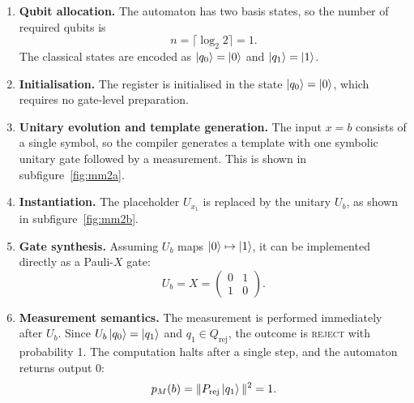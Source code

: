 \begin{enumerate}
  \item \textbf{Qubit allocation.} The automaton has two basis states, so the number of required qubits is
  \[
  n = \lceil \log_2 2 \rceil = 1.
  \]
  The classical states are encoded as $\ket{q_0} = \ket{0}$ and $\ket{q_1} = \ket{1}$.

  \item \textbf{Initialisation.} The register is initialised in the state $\ket{q_0} = \ket{0}$, which requires no gate-level preparation.

  \item \textbf{Unitary evolution and template generation.} The input $x = b$ consists of a single symbol, so the compiler generates a template with one symbolic unitary gate followed by a measurement. This is shown in subfigure~\ref{fig:mm2a}.

  \item \textbf{Instantiation.} The placeholder $U_{x_1}$ is replaced by the unitary $U_b$, as shown in subfigure~\ref{fig:mm2b}.

  \item \textbf{Gate synthesis.} Assuming $U_b$ maps $\ket{0} \mapsto \ket{1}$, it can be implemented directly as a Pauli-$X$ gate:
  \[
  U_b = X = 
  \begin{pmatrix}
  0 & 1 \\
  1 & 0
  \end{pmatrix}.
  \]

  \item \textbf{Measurement semantics.} The measurement is performed immediately after $U_b$. Since $U_b \ket{q_0} = \ket{q_1}$ and $q_1 \in Q_{\text{rej}}$, the outcome is \textsc{reject} with probability 1. The computation halts after a single step, and the automaton returns output $0$:
  \[
  p_M(b) = \|P_{\text{rej}} \ket{q_1}\|^2 = 1.
  \]
\end{enumerate}
\vspace{1em}
